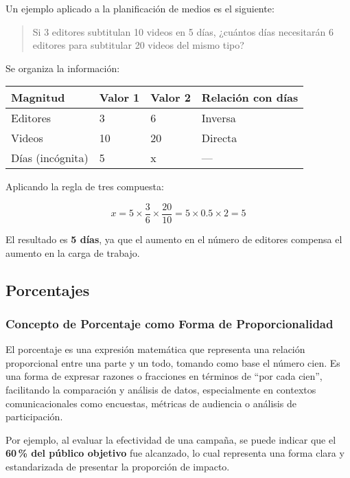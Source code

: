 \documentclass[
  stu,
  floatsintext,
  longtable,
  a4paper,
  nolmodern,
  notxfonts,
  notimes,
  colorlinks=true,linkcolor=blue,citecolor=blue,urlcolor=blue]{apa7}
\begin{document}
Un ejemplo aplicado a la planificación de medios es el siguiente:

\begin{quote}
Si 3 editores subtitulan 10 videos en 5 días, ¿cuántos días necesitarán
6 editores para subtitular 20 videos del mismo tipo?
\end{quote}

Se organiza la información:

\begin{longtable}[]{@{}llll@{}}
\toprule\noalign{}
Magnitud & Valor 1 & Valor 2 & Relación con días \\
\midrule\noalign{}
\endhead
\bottomrule\noalign{}
\endlastfoot
Editores & 3 & 6 & Inversa \\
Videos & 10 & 20 & Directa \\
Días (incógnita) & 5 & x & --- \\
\end{longtable}

Aplicando la regla de tres compuesta:

\[
x = 5 \times \frac{3}{6} \times \frac{20}{10} = 5 \times 0.5 \times 2 = 5
\]

El resultado es \textbf{5 días}, ya que el aumento en el número de
editores compensa el aumento en la carga de trabajo.

\subsection{Porcentajes}\label{porcentajes}

\subsubsection{Concepto de Porcentaje como Forma de
Proporcionalidad}\label{concepto-de-porcentaje-como-forma-de-proporcionalidad}

El porcentaje es una expresión matemática que representa una relación
proporcional entre una parte y un todo, tomando como base el número
cien. Es una forma de expresar razones o fracciones en términos de ``por
cada cien'', facilitando la comparación y análisis de datos,
especialmente en contextos comunicacionales como encuestas, métricas de
audiencia o análisis de participación.

Por ejemplo, al evaluar la efectividad de una campaña, se puede indicar
que el \textbf{60\,\% del público objetivo} fue alcanzado, lo cual
representa una forma clara y estandarizada de presentar la proporción de
impacto.
\end{document}
